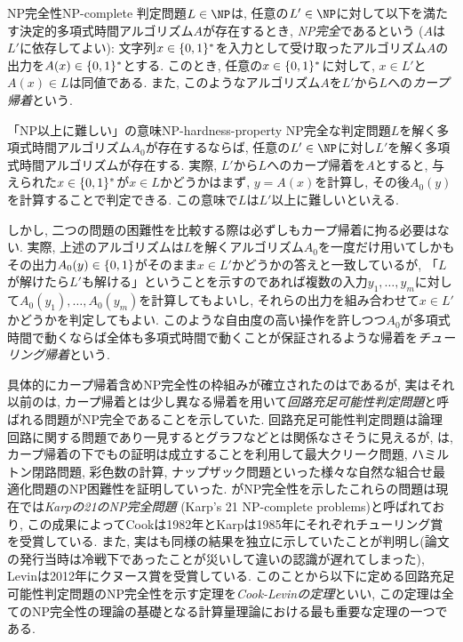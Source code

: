 \begin{definition}{NP完全性}{NP-complete}
  判定問題$L\in \NP$は, 任意の$L'\in\NP$に対して以下を満たす決定的多項式時間アルゴリズム$A$が存在するとき, \emph{NP完全}であるという ($A$は$L'$に依存してよい):
  文字列$x\in\{0,1\}^*$を入力として受け取ったアルゴリズム$A$の出力を$A(x)\in\{0,1\}^*$とする.
  このとき, 任意の$x\in\{0,1\}^*$に対して, $x\in L'$と$A(x)\in L$は同値である.
  また, このようなアルゴリズム$A$を$L'$から$L$への\emph{カープ帰着}という.
\end{definition}

\begin{remark}{「NP以上に難しい」の意味}{NP-hardness-property}
NP完全な判定問題$L$を解く多項式時間アルゴリズム$A_0$が存在するならば, 任意の$L'\in \NP$に対し$L'$を解く多項式時間アルゴリズムが存在する.
実際, $L'$から$L$へのカープ帰着を$A$とすると, 与えられた$x\in\{0,1\}^*$が$x\in L$かどうかはまず, $y=A(x)$を計算し, その後$A_0(y)$を計算することで判定できる.
この意味で$L$は$L'$以上に難しいといえる.

しかし, 二つの問題の困難性を比較する際は必ずしもカープ帰着に拘る必要はない.
実際, 上述のアルゴリズムは$L$を解くアルゴリズム$A_0$を一度だけ用いてしかもその出力$A_0(y)\in\{0,1\}$がそのまま$x\in L'$かどうかの答えと一致しているが, 「$L$が解けたら$L'$も解ける」ということを示すのであれば複数の入力$y_1,\dots,y_m$に対して$A_0(y_1),\dots,A_0(y_m)$を計算してもよいし, それらの出力を組み合わせて$x\in L'$かどうかを判定してもよい.
このような自由度の高い操作を許しつつ$A_0$が多項式時間で動くならば全体も多項式時間で動くことが保証されるような帰着を\emph{チューリング帰着}という.
\end{remark}

具体的にカープ帰着含めNP完全性の枠組みが確立されたのは\citet{Karp1972}であるが,
実はそれ以前の\citet{Cook1971}は, カープ帰着とは少し異なる帰着を用いて\emph{回路充足可能性判定問題}と呼ばれる問題がNP完全であることを示していた. 
回路充足可能性判定問題は論理回路に関する問題であり一見するとグラフなどとは関係なさそうに見えるが,
\citet{Karp1972}は, カープ帰着の下でも\cite{Cook1971}の証明は成立することを利用して最大クリーク問題, ハミルトン閉路問題, 彩色数の計算, ナップザック問題といった様々な自然な組合せ最適化問題のNP困難性を証明していった.
\citet{Karp1972}がNP完全性を示したこれらの問題は現在では\emph{Karpの21のNP完全問題} (Karp's 21 NP-complete problems)と呼ばれており,
この成果によってCookは1982年とKarpは1985年にそれぞれチューリング賞を受賞している.
また, 実は\citet{Levin1973}も同様の結果を独立に示していたことが判明し(論文の発行当時は冷戦下であったことが災いして違いの認識が遅れてしまった), Levinは2012年にクヌース賞を受賞している.
このことから以下に定める回路充足可能性判定問題のNP完全性を示す定理を\emph{Cook-Levinの定理}といい,
この定理は全てのNP完全性の理論の基礎となる計算量理論における最も重要な定理の一つである.

